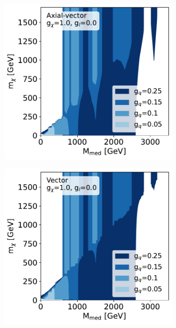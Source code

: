 \documentclass[a4paper, 11pt]{article}
\begin{document}
\begin{figure}[htp!]
  \begin{center}
  \begin{subfigure}[b]{0.49\textwidth}  
    \includegraphics[width=\textwidth]{figures/combined/massmass_axial_gl0.0_gdm1.0.pdf}
    \caption{}
    \label{subfig:combined_a}
  \end{subfigure}
  \begin{subfigure}[b]{0.49\textwidth}  
    \includegraphics[width=\textwidth]{figures/combined/massmass_vector_gl0.0_gdm1.0.pdf}

\end{subfigure}
\end{center}
\end{figure}
\end{document}
